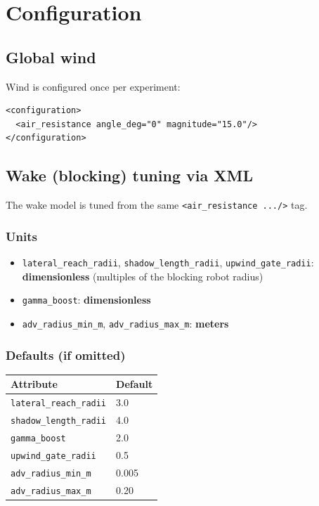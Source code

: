 \documentclass[11pt,a4paper]{article}
\begin{document}
\section{Configuration}

\subsection{Global wind}
Wind is configured once per experiment:
\begin{lstlisting}
<configuration>
  <air_resistance angle_deg="0" magnitude="15.0"/>
</configuration>
\end{lstlisting}

\subsection{Wake (blocking) tuning via XML}
The wake model is tuned from the same \texttt{<air\_resistance .../>} tag.

\subsubsection*{Units}
\begin{itemize}
  \item \texttt{lateral\_reach\_radii}, \texttt{shadow\_length\_radii}, \texttt{upwind\_gate\_radii}: \textbf{dimensionless} (multiples of the blocking robot radius)
  \item \texttt{gamma\_boost}: \textbf{dimensionless}
  \item \texttt{adv\_radius\_min\_m}, \texttt{adv\_radius\_max\_m}: \textbf{meters}
\end{itemize}

\subsubsection*{Defaults (if omitted)}
\begin{table}[H]
\centering
\small
\renewcommand{\arraystretch}{1.1}
\begin{tabular}{@{}ll@{}}
\toprule
\textbf{Attribute} & \textbf{Default}\\
\midrule
\texttt{lateral\_reach\_radii} & 3.0\\
\texttt{shadow\_length\_radii} & 4.0\\
\texttt{gamma\_boost}          & 2.0\\
\texttt{upwind\_gate\_radii}   & 0.5\\
\texttt{adv\_radius\_min\_m}   & 0.005\\
\texttt{adv\_radius\_max\_m}   & 0.20\\
\bottomrule
\end{tabular}
\end{table}
\end{document}
